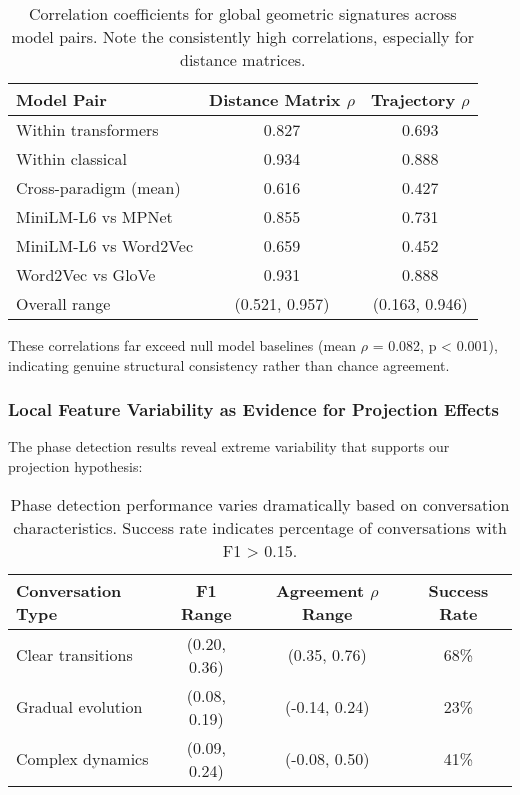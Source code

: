 \documentclass[11pt,letterpaper]{article}
\newcommand{\distanceCorrRange}{(0.521, 0.957)}
\newcommand{\transformerInternalCorr}{0.827}
\newcommand{\classicalInternalCorr}{0.934}
\newcommand{\crossParadigmCorr}{0.616}
\newcommand{\miniLMmpnetCorr}{0.855}
\newcommand{\miniLMwordTovecCorr}{0.659}
\newcommand{\wordTovecGloveCorr}{0.931}
\newcommand{\nullModelPValue}{0.001}
\newcommand{\nullBaselineCorr}{0.082}
\begin{document}
\begin{table}[h]
\centering
\begin{tabular}{lcc}
\toprule
Model Pair & Distance Matrix $\rho$ & Trajectory $\rho$ \\
\midrule
Within transformers & \transformerInternalCorr{} & 0.693 \\
Within classical & \classicalInternalCorr{} & 0.888 \\
Cross-paradigm (mean) & \crossParadigmCorr{} & 0.427 \\
\midrule
MiniLM-L6 vs MPNet & \miniLMmpnetCorr{} & 0.731 \\
MiniLM-L6 vs Word2Vec & \miniLMwordTovecCorr{} & 0.452 \\
Word2Vec vs GloVe & \wordTovecGloveCorr{} & 0.888 \\
\midrule
Overall range & \distanceCorrRange{} & (0.163, 0.946) \\
\bottomrule
\end{tabular}
\caption{Correlation coefficients for global geometric signatures across model pairs. Note the consistently high correlations, especially for distance matrices.}
\label{tab:correlations}
\end{table}

These correlations far exceed null model baselines (mean $\rho$ = \nullBaselineCorr{}, p < \nullModelPValue{}), indicating genuine structural consistency rather than chance agreement.

\subsubsection{Local Feature Variability as Evidence for Projection Effects}

The phase detection results reveal extreme variability that supports our projection hypothesis:

\begin{table}[h]
\centering
\begin{tabular}{lccc}
\toprule
Conversation Type & F1 Range & Agreement $\rho$ Range & Success Rate \\
\midrule
Clear transitions & (0.20, 0.36) & (0.35, 0.76) & 68\% \\
Gradual evolution & (0.08, 0.19) & (-0.14, 0.24) & 23\% \\
Complex dynamics & (0.09, 0.24) & (-0.08, 0.50) & 41\% \\
\bottomrule
\end{tabular}
\caption{Phase detection performance varies dramatically based on conversation characteristics. Success rate indicates percentage of conversations with F1 > 0.15.}
\label{tab:phase_performance}
\end{table}
\end{document}
